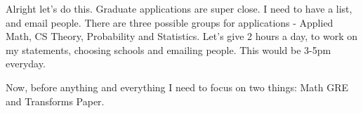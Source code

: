 \noindent {}

Alright let's do this. Graduate applications are super close. I need to have a list, and email people. There are three possible groups for applications - Applied Math, CS Theory, Probability and Statistics. Let's give 2 hours a day, to work on my statements, choosing schools and emailing people. This would be 3-5pm everyday.

Now, before anything and everything I need to focus on two things: Math GRE and Transforms Paper.